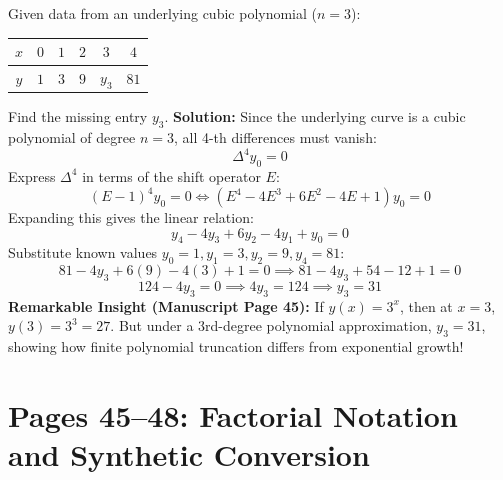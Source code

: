\begin{examplebox}
Given data from an underlying cubic polynomial ($n = 3$):
\begin{center}
\begin{tabular}{c|ccccc}
$x$ & $0$ & $1$ & $2$ & $3$ & $4$ \\
\hline
$y$ & $1$ & $3$ & $9$ & $y_3$ & $81$
\end{tabular}
\end{center}
Find the missing entry $y_3$.
\textbf{Solution:}
Since the underlying curve is a cubic polynomial of degree $n = 3$, all 4-th differences must vanish:
\begin{equation}
    \Delta^4 y_0 = 0
\end{equation}
Express $\Delta^4$ in terms of the shift operator $E$:
\begin{equation}
    (E - 1)^4 y_0 = 0 \iff (E^4 - 4E^3 + 6E^2 - 4E + 1) y_0 = 0
\end{equation}
Expanding this gives the linear relation:
\begin{equation}
    y_4 - 4 y_3 + 6 y_2 - 4 y_1 + y_0 = 0
\end{equation}
Substitute known values $y_0 = 1, y_1 = 3, y_2 = 9, y_4 = 81$:
\begin{equation}
    81 - 4 y_3 + 6(9) - 4(3) + 1 = 0 \implies 81 - 4 y_3 + 54 - 12 + 1 = 0
\end{equation}
\begin{equation}
    124 - 4 y_3 = 0 \implies 4 y_3 = 124 \implies \boxed{y_3 = 31}
\end{equation}
\textbf{Remarkable Insight (Manuscript Page 45):} If $y(x) = 3^x$, then at $x = 3$, $y(3) = 3^3 = 27$. But under a 3rd-degree polynomial approximation, $y_3 = 31$, showing how finite polynomial truncation differs from exponential growth!
\end{examplebox}

\section{Pages 45--48: Factorial Notation and Synthetic Conversion}
\label{sec:factorial_polynomials}

